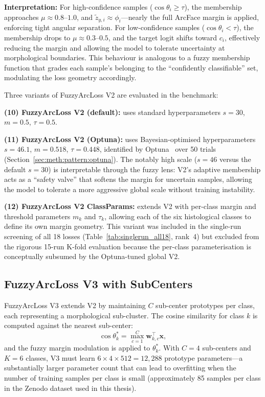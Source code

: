\textbf{Interpretation:} For high-confidence samples ($\cos\theta_i \geq \tau$), the membership approaches $\mu \approx 0.8$--$1.0$, and $\tilde{z}_{y,i} \approx \phi_i$---nearly the full ArcFace margin is applied, enforcing tight angular separation.
For low-confidence samples ($\cos\theta_i < \tau$), the membership drops to $\mu \approx 0.3$--$0.5$, and the target logit shifts toward $c_i$, effectively reducing the margin and allowing the model to tolerate uncertainty at morphological boundaries.
This behaviour is analogous to a fuzzy membership function that grades each sample's belonging to the ``confidently classifiable'' set, modulating the loss geometry accordingly.

Three variants of FuzzyArcLoss V2 are evaluated in the benchmark:

\textbf{(10) FuzzyArcLoss V2 (default):} uses standard hyperparameters $s = 30$, $m = 0.5$, $\tau = 0.5$.

\textbf{(11) FuzzyArcLoss V2 (Optuna):} uses Bayesian-optimised hyperparameters $s = 46.1$, $m = 0.518$, $\tau = 0.448$, identified by Optuna~\cite{akiba2019optuna} over 50 trials (Section~\ref{sec:meth:pattern:optuna}).
The notably high scale ($s = 46$ versus the default $s = 30$) is interpretable through the fuzzy lens: V2's adaptive membership acts as a ``safety valve'' that softens the margin for uncertain samples, allowing the model to tolerate a more aggressive global scale without training instability.

\textbf{(12) FuzzyArcLoss V2 ClassParams:} extends V2 with per-class margin and threshold parameters $m_k$ and $\tau_k$, allowing each of the six histological classes to define its own margin geometry.
This variant was included in the single-run screening of all 18 losses (Table~\ref{tab:singlerun_all18}, rank~4) but excluded from the rigorous 15-run K-fold evaluation because the per-class parameterisation is conceptually subsumed by the Optuna-tuned global V2.


\subsection{FuzzyArcLoss V3 with SubCenters}
\label{sec:bg:fuzzyarcloss_v3}

FuzzyArcLoss V3 extends V2 by maintaining $C$ sub-center prototypes per class, each representing a morphological sub-cluster.
The cosine similarity for class $k$ is computed against the nearest sub-center:
\begin{equation}
\label{eq:subcenter}
\cos\theta_k^{*} = \max_{c=1}^{C} \mathbf{w}_{k,c}^\top \mathbf{x},
\end{equation}
and the fuzzy margin modulation is applied to $\theta_k^{*}$.
With $C = 4$ sub-centers and $K = 6$ classes, V3 must learn $6 \times 4 \times 512 = 12{,}288$ prototype parameters---a substantially larger parameter count that can lead to overfitting when the number of training samples per class is small (approximately 85 samples per class in the Zenodo dataset used in this thesis).

